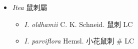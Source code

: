 
  \begin{itemize}
 \item[] \textit{Itea} 鼠刺屬
                                
  \begin{itemize}
        \item[] \textit{I. oldhamii} C. K. Schneid.  鼠刺   LC
        \item[] \textit{I. parviflora} Hemsl.  小花鼠刺  \# LC
  \end{itemize}
  \end{itemize}
